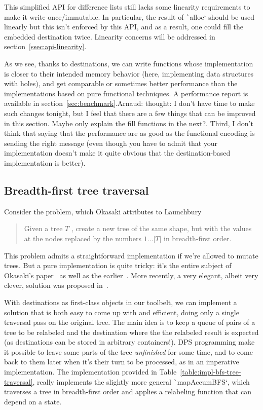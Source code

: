 \documentclass[english]{jflart}
\newcommand{\TODO}[1]{{\color{red}\large #1}}
\begin{document}
This simplified API for difference lists still lacks some linearity requirements to make it write-once/immutable. In particular, the result of \texttt`alloc` should be used linearly but this isn't enforced by this API, and as a result, one could fill the embedded destination twice. Linearity concerns will be addressed in section~\ref{ssec:api-linearity}.

As we see, thanks to destinations, we can write functions whose implementation is closer to their intended memory behavior (here, implementing data structures with holes), and get comparable or sometimes better performance than the implementations based on pure functional techniques. A performance report is available in section~\ref{sec:benchmark}.\TODO{Arnaud: thought: I don't have time to make such changes tonight, but I feel that there are a few things that can be improved in this section. Maybe only explain the fill functions in the next?. Third, I don't think that saying that the performance are as good as the functional encoding is sending the right message (even though you have to admit that your implementation doesn't make it quite obvious that the destination-based implementation is better).}

\subsection{Breadth-first tree traversal}\label{ssec:bf-tree-traversal}

Consider the problem, which Okasaki attributes to Launchbury~\cite{okasaki_bfs_2000}
\begin{quote}
  Given a tree $T$ , create a new tree of the same
  shape, but with the values at the nodes replaced
  by the numbers $1\ldots|T|$ in breadth-first order.
\end{quote}

This problem admits a straightforward implementation if we're allowed to mutate trees. But a pure implementation is quite tricky: it's the entire subject of Okasaki's paper~\cite{okasaki_bfs_2000} as well as the earlier~\cite{jones_gibbons_linearbfs_93}. More recently, a very elegant, albeit very clever, solution was proposed in~\cite{gibbons_phases_2023}.

With destinations as first-class objects in our toolbelt, we can implement a solution that is both easy to come up with and efficient, doing only a single traversal pass on the original tree. The main idea is to keep a queue of pairs of a tree to be relabeled and the destination where the the relabeled result is expected (as destinations can be stored in arbitrary containers!). DPS programming make it possible to leave some parts of the tree \emph{unfinished} for some time, and to come back to them later when it's their turn to be processed, as in an imperative implementation. The implementation provided in Table~\ref{table:impl-bfs-tree-traversal}, really implements the slightly more general \texttt`mapAccumBFS`, which traverses a tree in breadth-first order and applies a relabeling function that can depend on a state.
\end{document}
